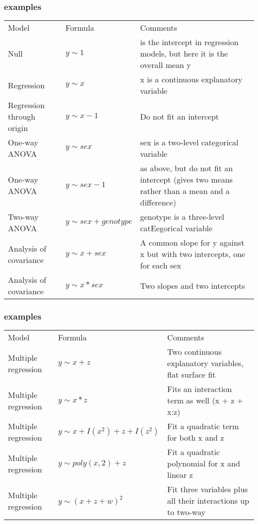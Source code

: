 \documentclass[xcolor={table},handout]{beamer}
\begin{document}
\begin{frame}\frametitle{examples}
\begin{center}\footnotesize
  \begin{tabular}{p{1.5cm} >{\ttfamily}p{2cm} p{6.2cm}} 
    \rowcolor{gray!40}
Model&Formula&Comments\\
Null&$y\sim 1$&is the intercept in regression models, but here it is the overall mean y\\
Regression&$y\sim x$ &x is a continuous explanatory variable\\
Regression through origin &$y \sim x-1$ & Do not fit an intercept\\
One-way ANOVA&$y \sim sex$ &sex is a two-level categorical variable\\
One-way ANOVA&$ y \sim sex-1$& as above, but do not fit an
                       intercept (gives two means
                      rather than a mean and a
                     difference)\\
Two-way ANOVA&$y \sim sex + genotype$&genotype is a three-level
                                catEegorical variable\\
Analysis of covariance&$y \sim x + sex$& A common slope for y against
                                  x but with two intercepts, one
                                 for each sex\\
Analysis of covariance&$y \sim x * sex$& Two slopes and two intercepts\\
\end{tabular}
\end{center}
\end{frame}

\begin{frame}\frametitle{examples}
\begin{center}\footnotesize
  \begin{tabular}{p{1.5cm} >{\ttfamily}p{2cm} p{6.2cm}} 
    \rowcolor{gray!40}
Model&Formula&Comments\\
Multiple regression&$y\sim x + z$& Two continuous explanatory
                           variables, flat surface fit\\
Multiple regression&$y\sim x * z$& Fits an interaction term as well
                           (x + z + x:z)\\
Multiple regression &$y \sim x + I(x^2) + z + I(z^2)$& Fit a quadratic term for both x
                                               and z\\
Multiple regression&$y \sim poly(x,2) + z$& Fit a quadratic polynomial for x
                                      and linear z\\
Multiple regression&$y \sim (x + z + w)^2$& Fit three variables plus all their
                                     interactions up to two-way
\end{tabular}
\end{center}
\end{frame}




\appendix
\flushlinkimages
\end{document}
